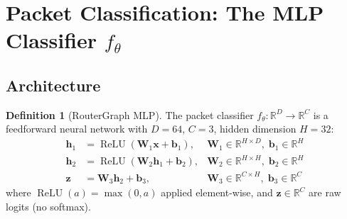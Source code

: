 \documentclass[11pt,a4paper,twoside]{article}
\theoremstyle{definition}
\newtheorem{definition}{Definition}[section]
\theoremstyle{remark}
\newcommand{\R}{\mathbb{R}}
\newcommand{\ReLU}{\operatorname{ReLU}}
\newcommand{\mat}[1]{\mathbf{#1}}
\newcommand{\vect}[1]{\mathbf{#1}}
\begin{document}
\section{Packet Classification: The MLP Classifier $f_\theta$}
\label{sec:classifier}

\subsection{Architecture}

\begin{definition}[RouterGraph MLP]
\label{def:mlp}
The packet classifier $f_\theta: \R^{D} \to \R^{C}$ is a feedforward neural network with $D = 64$, $C = 3$, hidden dimension $H = 32$:
\begin{align}
\vect{h}_1 &= \ReLU(\mat{W}_1 \vect{x} + \vect{b}_1), & \mat{W}_1 \in \R^{H \times D},\; \vect{b}_1 \in \R^{H} \\
\vect{h}_2 &= \ReLU(\mat{W}_2 \vect{h}_1 + \vect{b}_2), & \mat{W}_2 \in \R^{H \times H},\; \vect{b}_2 \in \R^{H} \\
\vect{z} &= \mat{W}_3 \vect{h}_2 + \vect{b}_3, & \mat{W}_3 \in \R^{C \times H},\; \vect{b}_3 \in \R^{C}
\end{align}
where $\ReLU(a) = \max(0, a)$ applied element-wise, and $\vect{z} \in \R^C$ are raw logits (no softmax).
\end{definition}
\end{document}
